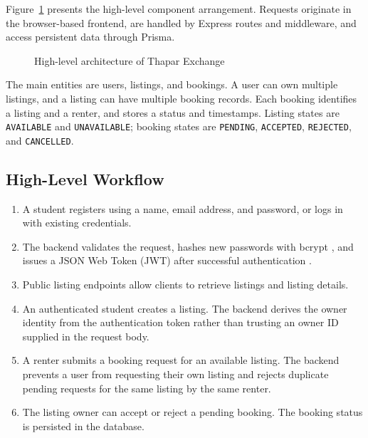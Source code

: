 \documentclass{tietreport}
\begin{document}
Figure~\ref{fig:system-architecture} presents the high-level component arrangement. Requests originate in the browser-based frontend, are handled by Express routes and middleware, and access persistent data through Prisma.

\begin{figure}[H]
\centering
{}
\caption{High-level architecture of Thapar Exchange}
\label{fig:system-architecture}
\end{figure}

The main entities are users, listings, and bookings. A user can own multiple listings, and a listing can have multiple booking records. Each booking identifies a listing and a renter, and stores a status and timestamps. Listing states are \texttt{AVAILABLE} and \texttt{UNAVAILABLE}; booking states are \texttt{PENDING}, \texttt{ACCEPTED}, \texttt{REJECTED}, and \texttt{CANCELLED}.

\subsection{High-Level Workflow}
\begin{enumerate}
  \item A student registers using a name, email address, and password, or logs in with existing credentials.
  \item The backend validates the request, hashes new passwords with bcrypt \cite{bcrypt}, and issues a JSON Web Token (JWT) after successful authentication \cite{jwt}.
  \item Public listing endpoints allow clients to retrieve listings and listing details.
  \item An authenticated student creates a listing. The backend derives the owner identity from the authentication token rather than trusting an owner ID supplied in the request body.
  \item A renter submits a booking request for an available listing. The backend prevents a user from requesting their own listing and rejects duplicate pending requests for the same listing by the same renter.
  \item The listing owner can accept or reject a pending booking. The booking status is persisted in the database.
\end{enumerate}
\end{document}
